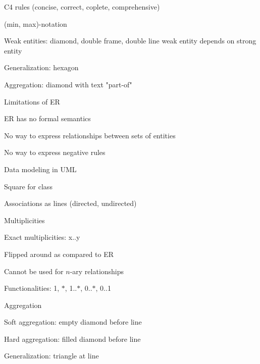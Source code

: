 		\item C4 rules (concise, correct, coplete, comprehensive)
	\enumend
	\item (min, max)-notation
	\item Weak entities: diamond, double frame, double line \arrow weak entity depends on strong entity
	\item Generalization: hexagon
	\item Aggregation: diamond with text "part-of"
	\item Limitations of ER
	\enumstart
		\item ER has no formal semantics
		\item No way to express relationships between sets of entities
		\item No way to express negative rules
	\enumend
	\item Data modeling in UML
	\enumstart
		\item Square for class
		\item Associations as lines (directed, undirected)
		\item Multiplicities
		\enumstart
			\item Exact multiplicities: x..y
			\item Flipped around as compared to ER
			\item Cannot be used for $n$-ary relationships
		\enumend
		\item Functionalities: 1, $*$, 1..$*$, 0..$*$, 0..1
		\item Aggregation
		\enumstart
			\item Soft aggregation: empty diamond before line
			\item Hard aggregation: filled diamond before line
		\enumend
		\item Generalization: triangle at line
	\enumend
\enumend
